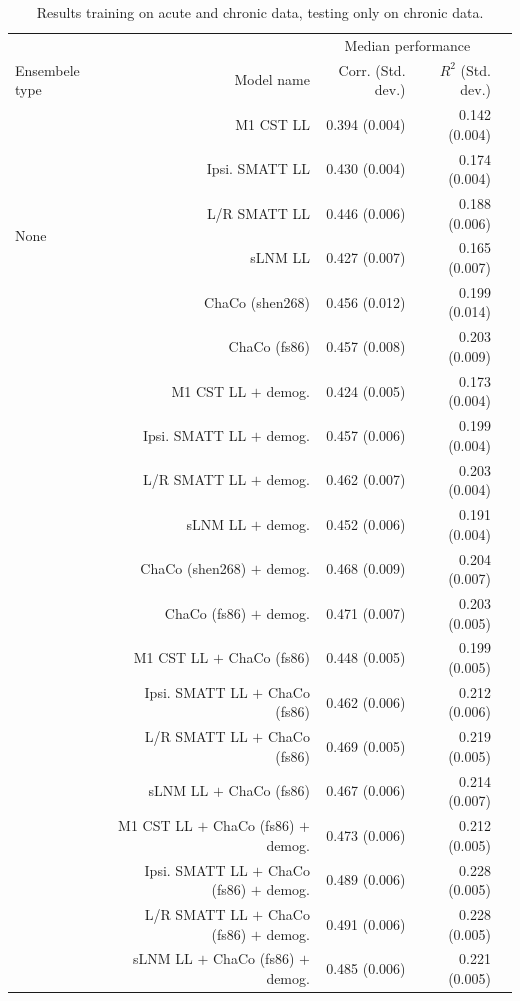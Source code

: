 \documentclass[10pt]{article}
\def\Plus{\texttt{+}}
\begin{document}
\begin{table}[h]
\centering
\caption{Results training on acute and chronic data, testing only on chronic data.}
\label{table:5}
\begin{tabular}{lrrrr}
\toprule
 &  & \multicolumn{2}{c}{Median performance} \\
 Ensembele type & Model name & Corr. (Std. dev.) & $R^2$ (Std. dev.) \\
\midrule
\multirow[t]{6}{*}{None} & M1 CST LL & 0.394 (0.004) & 0.142 (0.004) \\
 & Ipsi. SMATT LL & 0.430 (0.004) & 0.174 (0.004) \\
 & L/R SMATT LL & 0.446 (0.006) & 0.188 (0.006) \\
 & sLNM LL & 0.427 (0.007) & 0.165 (0.007) \\
 & ChaCo (shen268) & 0.456 (0.012) & 0.199 (0.014) \\
 & ChaCo (fs86) & 0.457 (0.008) & 0.203 (0.009) \\
 \arrayrulecolor{black!30}\midrule
\multirow[t]{6}{*}{Demographics} & M1 CST LL $\Plus$ demog. & 0.424 (0.005) & 0.173 (0.004) \\
 & Ipsi. SMATT LL $\Plus$ demog. & 0.457 (0.006) & 0.199 (0.004) \\
 & L/R SMATT LL $\Plus$ demog. & 0.462 (0.007) & 0.203 (0.004) \\
 & sLNM LL $\Plus$ demog. & 0.452 (0.006) & 0.191 (0.004) \\
 & ChaCo (shen268) $\Plus$ demog. & 0.468 (0.009) & 0.204 (0.007) \\
 & ChaCo (fs86) $\Plus$ demog. & 0.471 (0.007) & 0.203 (0.005) \\
 \arrayrulecolor{black!30}\midrule
\multirow[t]{4}{*}{chaco ll} & M1 CST LL $\Plus$ ChaCo (fs86) & 0.448 (0.005) & 0.199 (0.005) \\
 & Ipsi. SMATT LL $\Plus$ ChaCo (fs86) & 0.462 (0.006) & 0.212 (0.006) \\
 & L/R SMATT LL $\Plus$ ChaCo (fs86) & 0.469 (0.005) & 0.219 (0.005) \\
 & sLNM LL $\Plus$ ChaCo (fs86) & 0.467 (0.006) & 0.214 (0.007) \\
 \arrayrulecolor{black!30}\midrule
\multirow[t]{4}{*}{chaco ll demog} & M1 CST LL $\Plus$ ChaCo  (fs86) $\Plus$ demog. & 0.473 (0.006) & 0.212 (0.005) \\
 & Ipsi. SMATT LL $\Plus$ ChaCo  (fs86) $\Plus$ demog. & 0.489 (0.006) & 0.228 (0.005) \\
 & L/R SMATT LL $\Plus$ ChaCo  (fs86) $\Plus$ demog. & 0.491 (0.006) & 0.228 (0.005) \\
 & sLNM LL $\Plus$ ChaCo  (fs86) $\Plus$ demog. & 0.485 (0.006) & 0.221 (0.005) \\
\bottomrule
\end{tabular}
\end{table}
\end{document}
